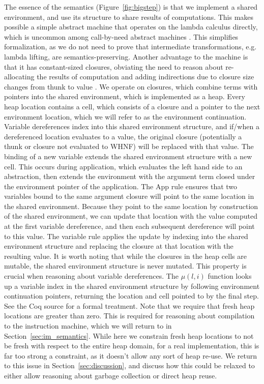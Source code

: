 The essence of the \ce semantics (Figure~\ref{fig:bigstep}) is that we implement a shared
environment, and use its structure to share results of computations. This makes
possible a simple abstract machine that operates on the lambda calculus directly,
which is uncommon among call-by-need abstract machines
\cite{jonesstg,launchburynatural,TIM,johnsson1984efficient}. This simplifies
formalization, as we do not need to prove that intermediate transformations,
e.g. lambda lifting, are semantics-preserving. Another advantage to the \ce
machine is that it has constant-sized closures, obviating the need to reason
about re-allocating the results of computation and adding indirections due to
closure size changes from thunk to value \cite{jonesstg}. We operate on
closures, which combine terms with pointers into the shared environment, which
is implemented as a heap. Every heap location contains a cell, which consists of
a closure and a pointer to the next environment location, which we will refer to
as the environment continuation.  Variable dereferences index into this shared
environment structure, and if/when a dereferenced location evaluates to a value,
the original closure (potentially a thunk or closure not evaluated to WHNF) will
be replaced with that value. The binding of a new variable extends the shared
environment structure with a new
cell. This occurs during application, which evaluates the left hand side to an
abstraction, then extends the environment with the argument term closed under the
environment pointer of the application. The App rule ensures that two
variables bound to the same argument closure will point to the same location in
the shared environment. Because they point to the same location by construction
of the shared environment, we can update that location with the value computed
at the first variable dereference, and then each subsequent dereference will
point to this value. The variable rule applies the update by indexing into the
shared environment structure and replacing the closure at that location with the
resulting value. It is worth noting that while the closures in the heap cells
are mutable, the shared environment structure is never mutated. This property is
crucial when reasoning about variable dereferences. The $\mu\left(l, i\right)$
function looks up a variable index in the shared environment structure by
following environment continuation pointers, returning the location and cell
pointed to by the final step. See the Coq source
for a formal treatment. Note that we require that fresh heap locations are
greater than zero. This is required for reasoning about compilation to the
instruction machine, which we will return to in Section~\ref{sec:im_semantics}.
While here we constrain fresh heap locations to not be fresh with respect to the
entire heap domain, for a real implementation, this is far too strong a
constraint, as it doesn't allow any sort of heap re-use. We return to this issue
in Section~\ref{sec:discussion}, and discuss how this could be relaxed to either
allow reasoning about garbage collection or direct heap reuse.

